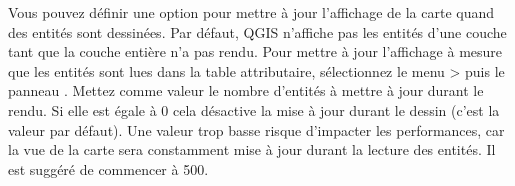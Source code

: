 %

\label{label_updatemap}

Vous pouvez d\'efinir une option pour mettre \`a jour l'affichage de la carte quand des entit\'es sont dessin\'ees. Par d\'efaut, QGIS n'affiche pas les entit\'es d'une couche tant que la couche enti\`ere n'a pas rendu. Pour mettre \`a jour l'affichage \`a mesure que les entit\'es sont lues dans la table attributaire, s\'electionnez le menu  >  puis le panneau . Mettez comme valeur le nombre d'entit\'es \`a mettre \`a jour durant le rendu. Si elle est \'egale \`a 0 cela d\'esactive la mise \`a jour durant le dessin (c'est la valeur par d\'efaut). Une valeur trop basse risque d'impacter les performances, car la vue de la carte sera constamment mise \`a jour durant la lecture des entit\'es. Il est sugg\'er\'e de commencer \`a 500.

%
%

